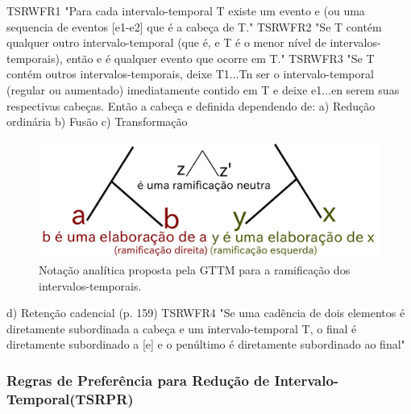 \documentclass[
	12pt,				%
	openright,			%
	twoside,			%
	a4paper,			%
	english,			%
	french,				%
	spanish,			%
	brazil				%
	]{abntex2}
\begin{document}
\begin{citacao}
TSRWFR1 "Para cada intervalo-temporal T existe um evento e (ou uma sequencia de eventos [e1-e2] que é a cabeça de T." 
TSRWFR2 "Se T contém qualquer outro intervalo-temporal (que é, e T é o menor nível de intervalos-temporais), então e é qualquer evento que ocorre em T." 
TSRWFR3 "Se T contém outros intervalos-temporais, deixe T1...Tn ser o intervalo-temporal (regular ou aumentado) imediatamente contido em T e deixe e1...en serem suas respectivas cabeças. Então a cabeça e definida dependendo de: 
a) Redução ordinária 
b) Fusão 
c) Transformação 


\begin{figure}[htb]
	\caption{\label{fig_grafico}Notação analítica proposta pela GTTM para a ramificação dos intervalos-temporais.}
	\begin{center}
	    \includegraphics[scale=0.5]{gttm/ramificacoes_arvore.pdf}
	\end{center}
\end{figure}


d) Retenção cadencial (p. 159) 
TSRWFR4 "Se uma cadência de dois elementos é diretamente subordinada a cabeça e um intervalo-temporal T, o final é diretamente subordinado a [e] e o penúltimo é diretamente subordinado ao final" 
 \cite{lerdahl1983generative}
\end{citacao}




\subsubsection{Regras de Preferência para Redução de Intervalo-Temporal(TSRPR) }
\end{document}
